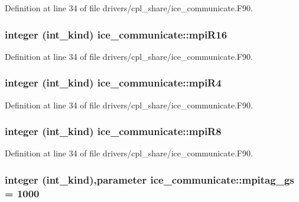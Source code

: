 Definition at line 34 of file drivers/cpl\_\-share/ice\_\-communicate.F90.\hypertarget{namespaceice__communicate_a817450a2b9532a4c7acb648ef5c1a8a4}{
\subsubsection[{mpiR16}]{\setlength{\rightskip}{0pt plus 5cm}integer (int\_\-kind) {\bf ice\_\-communicate::mpiR16}}}
\label{namespaceice__communicate_a817450a2b9532a4c7acb648ef5c1a8a4}


Definition at line 34 of file drivers/cpl\_\-share/ice\_\-communicate.F90.\hypertarget{namespaceice__communicate_a0f8744049bd83997c68c5181972a7930}{
\subsubsection[{mpiR4}]{\setlength{\rightskip}{0pt plus 5cm}integer (int\_\-kind) {\bf ice\_\-communicate::mpiR4}}}
\label{namespaceice__communicate_a0f8744049bd83997c68c5181972a7930}


Definition at line 34 of file drivers/cpl\_\-share/ice\_\-communicate.F90.\hypertarget{namespaceice__communicate_a935c7b05783b45e8b2465e9e671290f8}{
\subsubsection[{mpiR8}]{\setlength{\rightskip}{0pt plus 5cm}integer (int\_\-kind) {\bf ice\_\-communicate::mpiR8}}}
\label{namespaceice__communicate_a935c7b05783b45e8b2465e9e671290f8}


Definition at line 34 of file drivers/cpl\_\-share/ice\_\-communicate.F90.\hypertarget{namespaceice__communicate_a33a81d2a5d816dcfde8d2232e1f1b80e}{
\subsubsection[{mpitag\_\-gs}]{\setlength{\rightskip}{0pt plus 5cm}integer (int\_\-kind),parameter {\bf ice\_\-communicate::mpitag\_\-gs} = 1000}}
\label{namespaceice__communicate_a33a81d2a5d816dcfde8d2232e1f1b80e}


